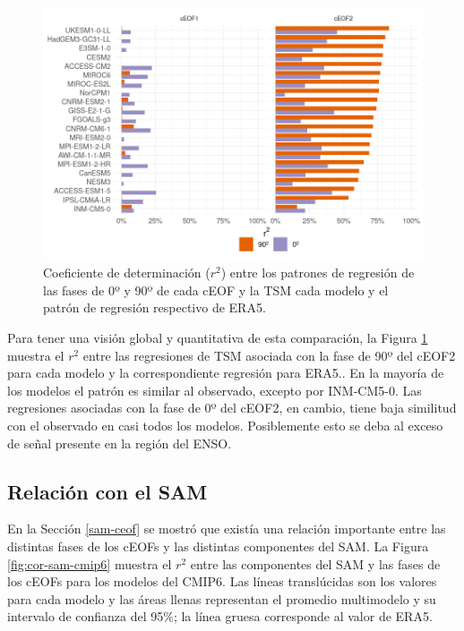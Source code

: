 \documentclass[12pt,oneside,a4paper]{reedthesis}
\begin{document}
\begin{figure}

{\centering \includegraphics{figures/50-cmip6/cor-sst-regr-1} 

}

\caption{Coeficiente de determinación (\(r^2\)) entre los patrones de regresión de las fases de 0º y 90º de cada cEOF y la TSM cada modelo y el patrón de regresión respectivo de ERA5.}\label{fig:cor-sst-regr}
\end{figure}

Para tener una visión global y quantitativa de esta comparación, la Figura \ref{fig:cor-sst-regr} muestra el \(r^2\) entre las regresiones de TSM asociada con la fase de 90º del cEOF2 para cada modelo y la correspondiente regresión para ERA5..
En la mayoría de los modelos el patrón es similar al observado, excepto por INM-CM5-0.
Las regresiones asociadas con la fase de 0º del cEOF2, en cambio, tiene baja similitud con el observado en casi todos los modelos.
Posiblemente esto se deba al exceso de señal presente en la región del ENSO.

\hypertarget{relaciuxf3n-con-el-sam}{%
\subsection{Relación con el SAM}\label{relaciuxf3n-con-el-sam}}

En la Sección \ref{sam-ceof} se mostró que existía una relación importante entre las distintas fases de los cEOFs y las distintas componentes del SAM.
La Figura \ref{fig:cor-sam-cmip6} muestra el \(r^2\) entre las componentes del SAM y las fases de los cEOFs para los modelos del CMIP6.
Las líneas translúcidas son los valores para cada modelo y las áreas llenas representan el promedio multimodelo y su intervalo de confianza del 95\%; la línea gruesa corresponde al valor de ERA5.
\end{document}
